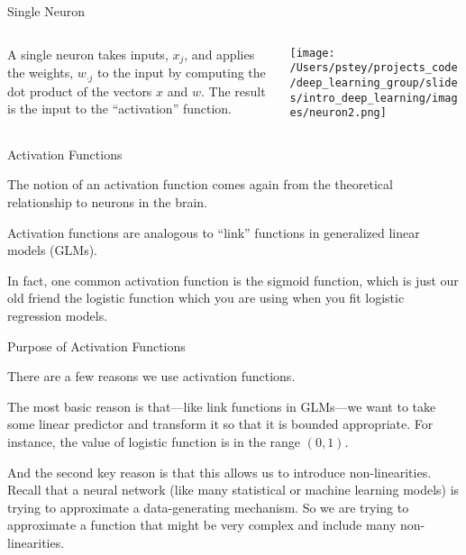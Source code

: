 \documentclass[pdf]{beamer}
\begin{document}
	\begin{frame}{Single Neuron}
	\begin{columns}
		\begin{column}{0.5\textwidth}
		A single neuron takes inputs, $x_j$, and applies the weights, $w_{\cdot j}$ to the input by computing the dot product of the vectors $x$ and $w$. The result is the input to the ``activation'' function.

		\end{column}
	
		\begin{column}{0.5\textwidth}
		\texttt{[image: /Users/pstey/projects\_code/deep\_learning\_group/slides/intro\_deep\_learning/images/neuron2.png]}
		\end{column}
	\end{columns}
	\end{frame}

	\begin{frame}{Activation Functions}
	
	The notion of an activation function comes again from the theoretical relationship to neurons in the brain.
	\vspace{2em}
	
	Activation functions are analogous to ``link'' functions in generalized linear models (GLMs). 
	
	\vspace{2em} 
	In fact, one common activation function is the sigmoid function, which is just our old friend the logistic function which you are using when you fit logistic regression models.
	\end{frame}
	
	
	\begin{frame}{Purpose of Activation Functions}
	
	There are a few reasons we use activation functions.	
	\vspace{2em}
	
	The most basic reason is that---like link functions in GLMs---we want to take some linear predictor and transform it so that it is bounded appropriate. For instance, the value of logistic function is in the range $(0, 1)$. 
	
	\vspace{2em}
	
	And the second key reason is that this allows us to introduce non-linearities. Recall that a neural network (like many statistical or machine learning models) is trying to approximate a data-generating mechanism. So we are trying to approximate a function that might be very complex and include many non-linearities.
	\end{frame}
	
\end{document}

